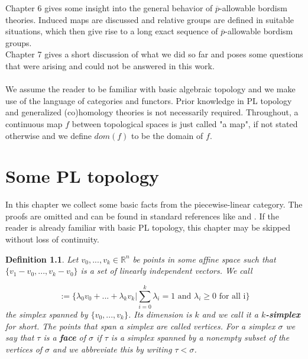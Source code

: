 \documentclass{scrreprt}
\newtheorem{definition}[prop]{Definition}
\begin{document}
Chapter 6 gives some insight into the general behavior of $\overline{p}$-allowable bordism theories. Induced maps are discussed and relative groups are defined in suitable situations, which then give rise to a long exact sequence of $\overline{p}$-allowable bordism groups. \\
Chapter 7 gives a short discussion of what we did so far and poses some questions that were arising and could not be answered in this work. \\ \\
We assume the reader to be familiar with basic algebraic topology and we make use of the language of categories and functors. Prior knowledge in PL topology and generalized (co)homology theories is not necessarily required. Throughout, a continuous map $f$ between topological spaces is just called "a map", if not stated otherwise and we define $dom(f)$ to be the domain of $f$.


\chapter{Some PL topology}
\label{sec:Einleitung}

In this chapter we collect some basic facts from the piecewise-linear category. The proofs are omitted and can be found in standard references like \cite{pltopo} and \cite{hatcher}. If the reader is already familiar with basic PL topology, this chapter may be skipped without loss of continuity.

\begin{definition}
Let $v_0,...,v_k \in \mathbb{R}^n$ be points in some affine space such that $\{ v_1-v_0,...,v_k-v_0 \}$ is a set of linearly independent vectors. We call

\begin{equation*}
[v_0,...,v_k] := \Biggl \{  \lambda_0v_0+...+ \lambda_kv_k \Bigg |  \sum_{i=0}^k \lambda_i =1 \text{ and } \lambda_i \geq 0 \text{ for all i} \Biggr \}
\end{equation*}
the simplex spanned by $\{v_0,...,v_k \}$. Its dimension is $k$ and we call it a \textbf{$k$-simplex} for short. The points that span a simplex are called vertices. For a simplex $\sigma$ we say that $\tau$ is a \textbf{face} of $\sigma$ if $\tau$ is a simplex spanned by a nonempty subset of the vertices of $\sigma$ and we abbreviate this by writing $\tau < \sigma$.
\end{definition}
\end{document}
